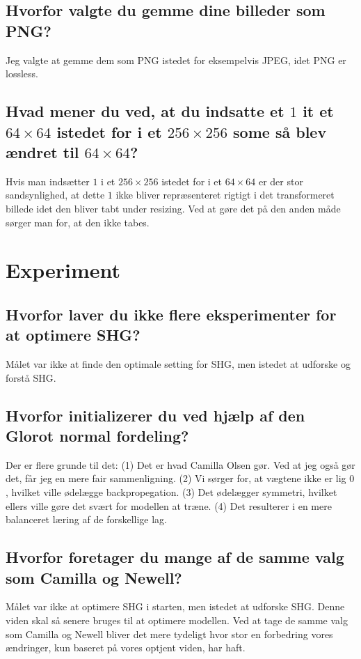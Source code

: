 \documentclass[a4paper]{article}
\begin{document}
\subsection{Hvorfor valgte du gemme dine billeder som PNG?}
Jeg valgte at gemme dem som PNG istedet for eksempelvis JPEG, idet PNG er lossless.

\subsection{Hvad mener du ved, at du indsatte et $1$ it et $64 \times 64$ istedet for i et $256 \times 256$ some så blev ændret til $64 \times 64$?}
Hvis man indsætter $1$ i et $256 \times 256$ istedet for i et $64 \times 64$ er der stor sandsynlighed, at dette $1$ ikke bliver repræsenteret rigtigt i det transformeret billede idet den bliver tabt under resizing. Ved at gøre det på den anden måde sørger man for, at den ikke tabes.

\section{Experiment}
\subsection{Hvorfor laver du ikke flere eksperimenter for at optimere SHG?}
Målet var ikke at finde den optimale setting for SHG, men istedet at udforske og forstå SHG. 

\subsection{Hvorfor initializerer du ved hjælp af den Glorot normal fordeling?}
Der er flere grunde til det: (1) Det er hvad Camilla Olsen gør. Ved at jeg også gør det, får jeg en mere fair sammenligning. (2) Vi sørger for, at vægtene ikke er lig $0$, hvilket ville ødelægge backpropegation. (3) Det ødelægger symmetri, hvilket ellers ville gøre det svært for modellen at træne. (4) Det resulterer i en mere balanceret læring af de forskellige lag.

\subsection{Hvorfor foretager du mange af de samme valg som Camilla og Newell?}
Målet var ikke at optimere SHG i starten, men istedet at udforske SHG. Denne viden skal så senere bruges til at optimere modellen. Ved at tage de samme valg som Camilla og Newell bliver det mere tydeligt hvor stor en forbedring vores ændringer, kun baseret på vores optjent viden, har haft.
\end{document}
